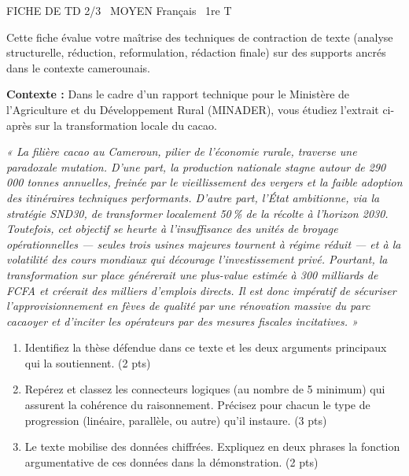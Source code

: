 \documentclass[11pt]{article}
\begin{document}
\begin{tcolorbox}[enhanced,colback=popink,colframe=popink,arc=10pt,boxrule=0pt,left=12pt,right=12pt,top=9pt,bottom=9pt]
{\color{white}\popxbold\small FICHE DE TD 2/3 \textbullet\ MOYEN \hfill Français \textbullet\ 1re T\par}
\end{tcolorbox}
\vspace{4pt}
\noindent Cette fiche évalue votre maîtrise des techniques de contraction de texte (analyse structurelle, réduction, reformulation, rédaction finale) sur des supports ancrés dans le contexte camerounais.

\begin{exercice}
\textbf{Contexte :} Dans le cadre d'un rapport technique pour le Ministère de l'Agriculture et du Développement Rural (MINADER), vous étudiez l'extrait ci-après sur la transformation locale du cacao.

\textit{« La filière cacao au Cameroun, pilier de l'économie rurale, traverse une paradoxale mutation. D'une part, la production nationale stagne autour de 290\,000 tonnes annuelles, freinée par le vieillissement des vergers et la faible adoption des itinéraires techniques performants. D'autre part, l'État ambitionne, via la stratégie SND30, de transformer localement 50\,\% de la récolte à l'horizon 2030. Toutefois, cet objectif se heurte à l'insuffisance des unités de broyage opérationnelles — seules trois usines majeures tournent à régime réduit — et à la volatilité des cours mondiaux qui décourage l'investissement privé. Pourtant, la transformation sur place générerait une plus-value estimée à 300 milliards de FCFA et créerait des milliers d'emplois directs. Il est donc impératif de sécuriser l'approvisionnement en fèves de qualité par une rénovation massive du parc cacaoyer et d'inciter les opérateurs par des mesures fiscales incitatives. »}

\begin{enumerate}
    \item Identifiez la thèse défendue dans ce texte et les deux arguments principaux qui la soutiennent. (2 pts)
    \item Repérez et classez les connecteurs logiques (au nombre de 5 minimum) qui assurent la cohérence du raisonnement. Précisez pour chacun le type de progression (linéaire, parallèle, ou autre) qu'il instaure. (3 pts)
    \item Le texte mobilise des données chiffrées. Expliquez en deux phrases la fonction argumentative de ces données dans la démonstration. (2 pts)
\end{enumerate}
\end{exercice}
\end{document}
